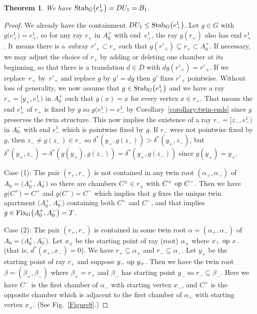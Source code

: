 \documentclass[pdftex]{sigma}
\numberwithin{equation}{section}
\newtheorem{Theorem}{Theorem}[section]
\def\a{\alpha}
\def\op{\hbox{ op }}
\begin{document}
\begin{Theorem}\label{theorem:Stabilizer}We have ${\rm Stab}_G\big(e^1_+\big) = D U_1 = B_1$.
\end{Theorem}
\begin{proof} We already have the containment $D U_1 \leq {\rm Stab}_G\big(e^1_+\big)$. Let $g\in G$ with
$g\big(e^1_+\big) = e^1_+$, so for any ray $r_+$ in $A_0^+$ with end~$e^1_+$, the ray $g(r_+)$ also has end $e^1_+$. It means there is a~subray $r'_+\subset r_+$ such that $g(r'_+)\subseteq r_+\subset A_0^+$. If necessary, we may adjust the choice of $r_+$ by adding or deleting one chamber at its beginning, so that there is a translation $d\in D$ with $dg(r'_+) = r'_+$. If we replace~$r_+$ by~$r'_+$ and replace $g$ by $g' = dg$ then $g'$ fixes $r'_+$ pointwise. Without loss of generality, we now assume that $g\in {\rm Stab}_G\big(e^1_+\big)$ and we have a ray $r_+ = \big[y_+,e^1_+\big)$ in $A_0^+$ such that
$g(x) = x$ for every vertex $x\in r_+$. That means the end $e^1_+$ of $r_+$ is fixed by $g$ so $g\big(e^1_-\big) = e^1_-$ by Corollary~\ref{corollary:twin-ends} since $g$ preserves the twin structure. This now implies the existence of a ray $r_- = [z_-,e^1_-)$ in $A_0^-$ with end $e^1_-$ which is pointwise fixed by $g$. If $r_-$ were not pointwise fixed by $g$,
then $z_- \neq g(z_-) \in r_-$ so $\delta^*(y_+, g(z_-)) > \delta^*(y_+, z_-)$, but $\delta^*(y_+, z_-) = \delta^*(g(y_+), g(z_-)) =
\delta^*(y_+, g(z_-))$ since $g(y_+) = y_+$.

Case (1): The pair $(r_+,r_-)$ is not contained in any twin root $(\a_+,\a_-)$ of $A_0 = \big(A_0^+,A_0^-\big)$ so there are chambers $C^\pm\in r_\pm$ with $C^+\op C^-$. Then we have $g\big(C^+\big) = C^+$ and $g\big(C^-\big) = C^-$ which implies that $g$ fixes the unique twin apartment $\big(A_0^+,A_0^-\big)$ containing both $C^+$ and $C^-$, and that implies $g\in {\rm Fix}_G\big(A_0^+,A_0^-\big) = T$.

Case (2): The pair $(r_+,r_-)$ is contained in some twin root $\a = (\a_+,\a_-)$ of $A_0 = \big(A_0^+,A_0^-\big)$. Let $x_\pm$ be the starting point of ray (root) $\a_\pm$ where $x_+\op x_-$ (that is, $d^*(x_+,x_-) = 0$). We have $r_+\subseteq \a_+$ and $r_-\subseteq \a_-$. Let $y_+$ be the starting point of ray $r_+$ and suppose $y_-\op y_+$. Then we have the twin root $\beta = (\beta_+,\beta_-)$ where $\beta_+ = r_+$ and $\beta_-$ has starting point $y_-$ so $r_-\subseteq\beta_-$. Here we have $C^-$ is the first chamber of $\a_-$ with starting vertex $x_-$, and $C^+$ is the opposite chamber which is adjacent to the first chamber of $\a_+$ with starting vertex $x_+$. (See Fig.~\ref{Figure8}.)


\end{proof}
\end{document}
